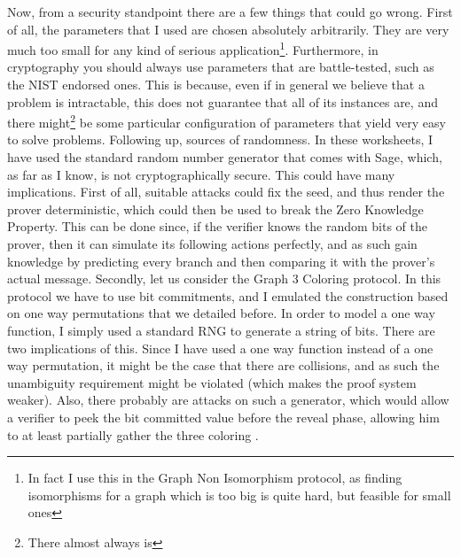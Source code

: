 \documentclass{article}
\begin{document}
\par Now, from a security standpoint there are a few things that could go wrong.
First of all, the parameters that I used are chosen absolutely arbitrarily. They are very much too small for any kind
of serious application\footnote{In fact I use this in the Graph Non Isomorphism protocol, as finding isomorphisms for a
    graph which is too big is quite hard, but feasible for small ones}.
Furthermore, in cryptography you should always use parameters that are battle-tested, such as the NIST \cite{barkerRecommendationPairWiseKeyEstablishment2018}
endorsed ones. This is because, even if in general we believe that a problem is intractable, this does not guarantee that
all of its instances are, and there might\footnote{There almost always is} be some particular configuration of parameters
that yield very easy to solve problems. Following up, sources of randomness. In these worksheets, I have used the standard
random number generator that comes with Sage, which, as far as I know, is not cryptographically secure. This could have
many implications. First of all, suitable attacks could fix the seed, and thus render the prover deterministic, which could
then be used to break the Zero Knowledge Property. This can be done since, if the verifier knows the random bits of the
prover, then it can simulate its following actions perfectly, and as such gain knowledge by predicting every branch and
then comparing it with the prover's actual message. Secondly, let us consider the Graph 3 Coloring
protocol. In this protocol we have to use bit commitments, and I emulated the construction based on one way permutations
that we detailed before. In order to model a one way function, I simply used a standard RNG to generate a string of bits.
There are two implications of this. Since I have used a one way function instead of a one way permutation,
it might be the case that there are collisions, and as such the unambiguity requirement might be violated (which makes
the proof system weaker). Also, there probably are attacks on such a generator, which would allow a verifier to peek
the bit committed value before the reveal phase, allowing him to at least partially gather the three coloring .



\appendix
\end{document}
